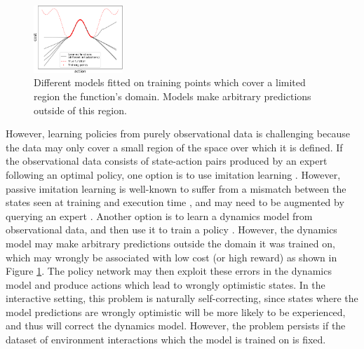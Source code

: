 \documentclass{article} %
\begin{document}
\begin{figure}
  \includegraphics[width=0.3\textwidth]{figures/driving/uncertainty_example2-crop.pdf}
  \caption{\label{simple-example}Different models fitted on training points which cover a limited region the function's domain. Models make arbitrary predictions outside of this region.}
\end{figure}
However, learning policies from purely observational data is challenging because the data may only cover a small region of the space over which it is defined.
If the observational data consists of state-action pairs produced by an expert following an optimal policy, one option is to use imitation learning \citep{Pomerleau91}.
However, passive imitation learning is well-known to suffer from a mismatch between the states seen at training and execution time \citep{Ross2010EfficientRF}, and may need to be augmented by querying an expert \citep{Dagger}.
Another option is to learn a dynamics model from observational data, and then use it to train a policy \citep{Nguyen1989}. However, the dynamics model may make arbitrary predictions outside the domain it was trained on, which may wrongly be associated with low cost (or high reward) as shown in Figure \ref{simple-example}. The policy network may then exploit these errors in the dynamics model and produce actions which lead to wrongly optimistic states.
In the interactive setting, this problem is naturally self-correcting, since states where the model predictions are wrongly optimistic will be more likely to be experienced, and thus will correct the dynamics model. However, the problem persists if the dataset of environment interactions which the model is trained on is fixed.
\end{document}

